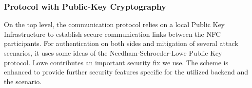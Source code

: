 
\subsubsection{Protocol with Public-Key Cryptography}\label{sec:proto:pubkey}
On the top level, the communication protocol relies on a local Public Key Infrastructure to establish secure communication links between the NFC participants.
For authentication on both sides and mitigation of several attack scenarios, it uses some ideas of the Needham-Schroeder-Lowe Public Key protocol. Lowe contributes an important security fix we use.
The scheme is enhanced to provide further security features specific for the utilized backend and the scenario.

